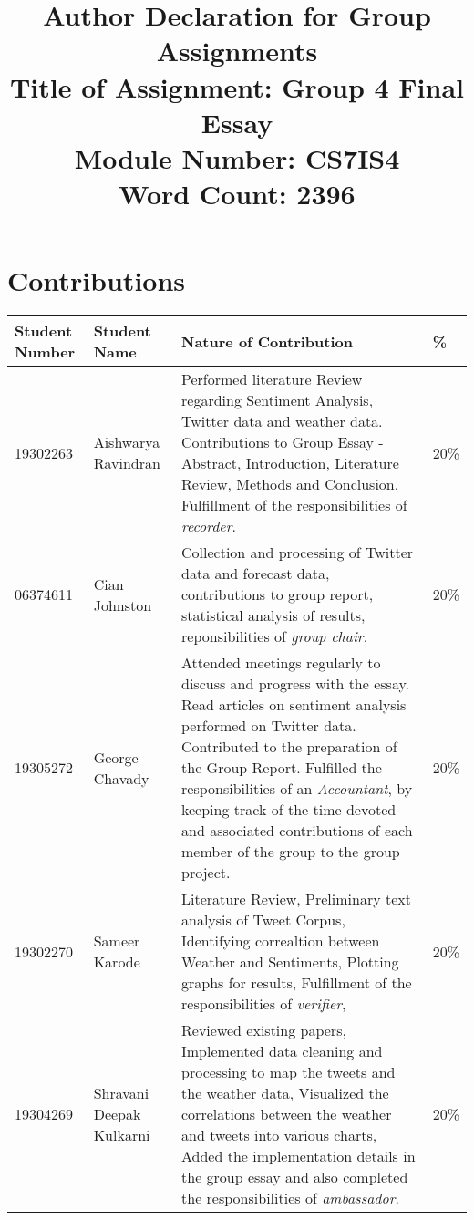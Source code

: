 \documentclass[a4paper,10pt]{article}
\begin{document}
\title{
    Author Declaration for Group Assignments \\
    \small Title of Assignment: Group 4 Final Essay \\
    \small Module Number: CS7IS4 \\
    \small Word Count: 2396
}
\author{}

\maketitle
\section{Contributions}
\begin{tabular}{ | p{2cm} | p{2cm} | p{10cm} | l | }
\hline
Student Number & Student Name & Nature of Contribution & \% \\ \hline
19302263 & Aishwarya Ravindran & Performed literature Review regarding Sentiment Analysis, Twitter data and weather data. Contributions to Group Essay - Abstract, Introduction, Literature Review, Methods and Conclusion. Fulfillment of the responsibilities of \textit{recorder}. & 20\% \\ \hline
06374611 & Cian Johnston & Collection and processing of Twitter data and forecast data, contributions to group report, statistical analysis of results, reponsibilities of \textit{group chair}. & 20\% \\ \hline
19305272 & George Chavady & Attended meetings regularly to discuss and progress with the essay. Read articles on sentiment analysis performed on Twitter data. Contributed to the preparation of the Group Report. Fulfilled the responsibilities of an \textit{Accountant}, by keeping track of the time devoted and associated contributions of each member of the group to the group project. & 20\% \\ \hline
19302270 & Sameer Karode & Literature Review, Preliminary text analysis of Tweet Corpus, Identifying correaltion between Weather and Sentiments, Plotting graphs for results, Fulfillment of the responsibilities of \textit{verifier}, & 20\% \\ \hline
19304269 & Shravani Deepak Kulkarni & Reviewed existing papers, Implemented data cleaning and processing to map the tweets and the weather data, Visualized the correlations between the weather and tweets into various charts, Added the implementation details in the group essay and also completed the responsibilities of \textit{ambassador}. & 20\% \\ \hline
\end{tabular}
\end{document}
